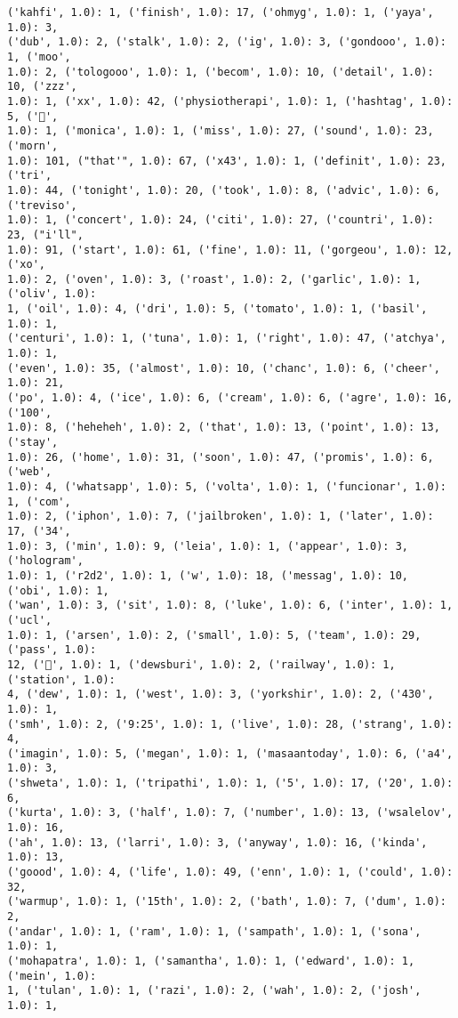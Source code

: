 \documentclass[11pt]{article}
\begin{document}
\begin{Verbatim}[commandchars=\\\{\}]
('kahfi', 1.0): 1, ('finish', 1.0): 17, ('ohmyg', 1.0): 1, ('yaya', 1.0): 3,
('dub', 1.0): 2, ('stalk', 1.0): 2, ('ig', 1.0): 3, ('gondooo', 1.0): 1, ('moo',
1.0): 2, ('tologooo', 1.0): 1, ('becom', 1.0): 10, ('detail', 1.0): 10, ('zzz',
1.0): 1, ('xx', 1.0): 42, ('physiotherapi', 1.0): 1, ('hashtag', 1.0): 5, ('💪',
1.0): 1, ('monica', 1.0): 1, ('miss', 1.0): 27, ('sound', 1.0): 23, ('morn',
1.0): 101, ("that'", 1.0): 67, ('x43', 1.0): 1, ('definit', 1.0): 23, ('tri',
1.0): 44, ('tonight', 1.0): 20, ('took', 1.0): 8, ('advic', 1.0): 6, ('treviso',
1.0): 1, ('concert', 1.0): 24, ('citi', 1.0): 27, ('countri', 1.0): 23, ("i'll",
1.0): 91, ('start', 1.0): 61, ('fine', 1.0): 11, ('gorgeou', 1.0): 12, ('xo',
1.0): 2, ('oven', 1.0): 3, ('roast', 1.0): 2, ('garlic', 1.0): 1, ('oliv', 1.0):
1, ('oil', 1.0): 4, ('dri', 1.0): 5, ('tomato', 1.0): 1, ('basil', 1.0): 1,
('centuri', 1.0): 1, ('tuna', 1.0): 1, ('right', 1.0): 47, ('atchya', 1.0): 1,
('even', 1.0): 35, ('almost', 1.0): 10, ('chanc', 1.0): 6, ('cheer', 1.0): 21,
('po', 1.0): 4, ('ice', 1.0): 6, ('cream', 1.0): 6, ('agre', 1.0): 16, ('100',
1.0): 8, ('heheheh', 1.0): 2, ('that', 1.0): 13, ('point', 1.0): 13, ('stay',
1.0): 26, ('home', 1.0): 31, ('soon', 1.0): 47, ('promis', 1.0): 6, ('web',
1.0): 4, ('whatsapp', 1.0): 5, ('volta', 1.0): 1, ('funcionar', 1.0): 1, ('com',
1.0): 2, ('iphon', 1.0): 7, ('jailbroken', 1.0): 1, ('later', 1.0): 17, ('34',
1.0): 3, ('min', 1.0): 9, ('leia', 1.0): 1, ('appear', 1.0): 3, ('hologram',
1.0): 1, ('r2d2', 1.0): 1, ('w', 1.0): 18, ('messag', 1.0): 10, ('obi', 1.0): 1,
('wan', 1.0): 3, ('sit', 1.0): 8, ('luke', 1.0): 6, ('inter', 1.0): 1, ('ucl',
1.0): 1, ('arsen', 1.0): 2, ('small', 1.0): 5, ('team', 1.0): 29, ('pass', 1.0):
12, ('🚂', 1.0): 1, ('dewsburi', 1.0): 2, ('railway', 1.0): 1, ('station', 1.0):
4, ('dew', 1.0): 1, ('west', 1.0): 3, ('yorkshir', 1.0): 2, ('430', 1.0): 1,
('smh', 1.0): 2, ('9:25', 1.0): 1, ('live', 1.0): 28, ('strang', 1.0): 4,
('imagin', 1.0): 5, ('megan', 1.0): 1, ('masaantoday', 1.0): 6, ('a4', 1.0): 3,
('shweta', 1.0): 1, ('tripathi', 1.0): 1, ('5', 1.0): 17, ('20', 1.0): 6,
('kurta', 1.0): 3, ('half', 1.0): 7, ('number', 1.0): 13, ('wsalelov', 1.0): 16,
('ah', 1.0): 13, ('larri', 1.0): 3, ('anyway', 1.0): 16, ('kinda', 1.0): 13,
('goood', 1.0): 4, ('life', 1.0): 49, ('enn', 1.0): 1, ('could', 1.0): 32,
('warmup', 1.0): 1, ('15th', 1.0): 2, ('bath', 1.0): 7, ('dum', 1.0): 2,
('andar', 1.0): 1, ('ram', 1.0): 1, ('sampath', 1.0): 1, ('sona', 1.0): 1,
('mohapatra', 1.0): 1, ('samantha', 1.0): 1, ('edward', 1.0): 1, ('mein', 1.0):
1, ('tulan', 1.0): 1, ('razi', 1.0): 2, ('wah', 1.0): 2, ('josh', 1.0): 1,

\end{Verbatim}
\end{document}
